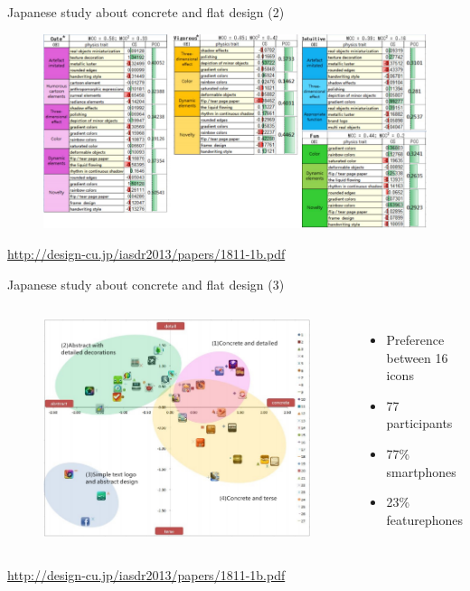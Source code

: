 \documentclass{beamer}
\begin{document}
\begin{frame}{Japanese study about concrete and flat design (2)}
    \begin{figure}
        \centering
        \includegraphics[scale=0.45]{caract.png}
      \end{figure}
	\begin{flushright}\tiny\url{http://design-cu.jp/iasdr2013/papers/1811-1b.pdf}\normalsize\end{flushright}
\end{frame}

\begin{frame}{Japanese study about concrete and flat design (3)}
	\begin{columns}[c]
      \begin{figure}
        \centering
        \includegraphics[scale=0.45]{map.png}
      \end{figure}
      \begin{itemize}
        \item Preference between 16 icons
        \item 77 participants
        \item 77\% smartphones
        \item 23\% featurephones
      \end{itemize} 
	\end{columns}
	\begin{flushright}\tiny\url{http://design-cu.jp/iasdr2013/papers/1811-1b.pdf}\normalsize\end{flushright}
\end{frame}
\end{document}
